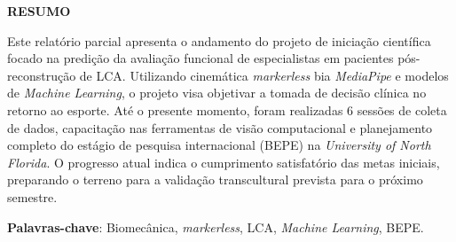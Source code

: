 \documentclass{article}
\begin{document}

\begin{center}
\Large \textbf{RESUMO}
\end{center}
\vspace{0.5cm}

\noindent Este relatório parcial apresenta o andamento do projeto de iniciação científica focado na predição da avaliação funcional de especialistas em pacientes pós-reconstrução de LCA. Utilizando cinemática \textit{markerless} bia \textit{MediaPipe} e modelos de \textit{Machine Learning}, o projeto visa objetivar a tomada de decisão clínica no retorno ao esporte. Até o presente momento, foram realizadas 6 sessões de coleta de dados, capacitação nas ferramentas de visão computacional e planejamento completo do estágio de pesquisa internacional (BEPE) na \textit{University of North Florida}. O progresso atual indica o cumprimento satisfatório das metas iniciais, preparando o terreno para a validação transcultural prevista para o próximo semestre. 

\vspace{0.5cm}
\noindent\textbf{Palavras-chave}: Biomecânica, \textit{markerless}, LCA, \textit{Machine Learning}, BEPE.
\end{document}
